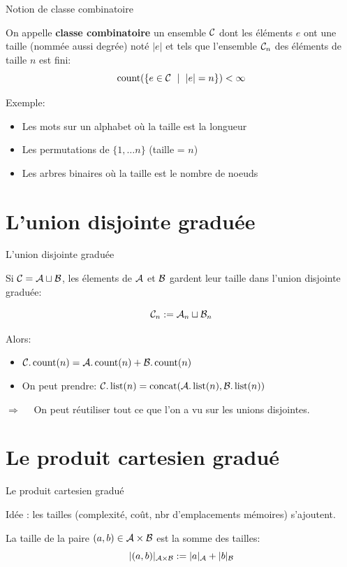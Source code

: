 \documentclass{beamer}
\begin{document}
\begin{frame}{Notion de classe combinatoire}
  \begin{DEFN}
    On appelle \textbf{classe combinatoire} un ensemble $\mathcal{C}$ dont les éléments
    $e$ ont une taille (nommée aussi degrée) noté $|e|$ et tels que l'ensemble
    $\mathcal{C}_n$ des éléments de taille $n$ est fini:
    \[
    \operatorname{count}(\{e\in \mathcal{C}\ \mid\ |e| = n\}) < \infty
    \]
  \end{DEFN}
  Exemple:
  \begin{itemize}
  \item Les mots sur un alphabet où la taille est la longueur
  \item Les permutations de $\{1,\dots n\}$ (taille = $n$)
  \item Les arbres binaires où la taille est le nombre de noeuds
  \end{itemize}
\end{frame}

\section{L'union disjointe graduée}
\begin{frame}{L'union disjointe graduée}

  Si $\mathcal{C} = \mathcal{A} \sqcup \mathcal{B}$, les élements de $\mathcal{A}$ et $\mathcal{B}$ gardent leur
  taille dans l'union disjointe graduée:

  \[\mathcal{C}_n := \mathcal{A}_n \sqcup \mathcal{B}_n\]

  Alors:
  \begin{itemize}
  \item $\mathcal{C}.\operatorname{count}(n) = \mathcal{A}.\operatorname{count}(n) + \mathcal{B}.\operatorname{count}(n)$
  \item On peut prendre: $\mathcal{C}.\operatorname{list}(n) = \operatorname{concat}(\mathcal{A}.\operatorname{list}(n), \mathcal{B}.\operatorname{list}(n))$
  \end{itemize}
  \bigskip\pause

  $\Longrightarrow\quad$ On peut réutiliser tout ce que l'on a vu sur les
  unions disjointes.
\end{frame}

\section{Le produit cartesien gradué}
\begin{frame}{Le produit cartesien gradué}

  Idée : les tailles (complexité, coût, nbr d'emplacements mémoires)
  s'ajoutent.
  \bigskip
  \begin{definition}
    La taille de la paire $(a, b)\in \mathcal{A}\times \mathcal{B}$ est la somme des tailles:
    \[|(a, b)|_{\mathcal{A}\times\mathcal{B}} := |a|_{\mathcal{A}} + |b|_{\mathcal{B}}\]
  \end{definition}
\end{frame}
\end{document}
